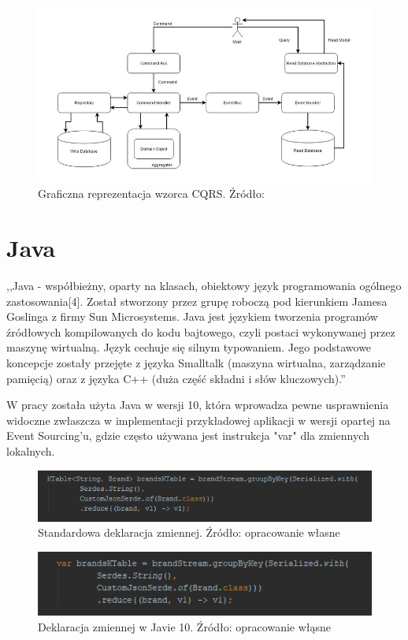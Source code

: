 \begin{figure}[h!]
  \centering
    \includegraphics[width=1.0\textwidth]{images/cqrs.jpg}
  \caption{Graficzna reprezentacja wzorca CQRS. Źródło: \cite{EventSourcing1} }
\end{figure}

\section{Java}
,,Java - współbieżny, oparty na klasach, obiektowy język programowania ogólnego zastosowania[4]. Został stworzony przez grupę roboczą pod kierunkiem Jamesa Goslinga z firmy Sun Microsystems. Java jest językiem tworzenia programów źródłowych kompilowanych do kodu bajtowego, czyli postaci wykonywanej przez maszynę wirtualną. Język cechuje się silnym typowaniem. Jego podstawowe koncepcje zostały przejęte z języka Smalltalk (maszyna wirtualna, zarządzanie pamięcią) oraz z języka C++ (duża część składni i słów kluczowych).''\cite{java}

W pracy została użyta Java w wersji 10, która wprowadza pewne usprawnienia widoczne zwłaszcza w implementacji przykładowej aplikacji w wersji opartej na Event Sourcing'u, gdzie często używana jest instrukcja "var" dla zmiennych lokalnych.


\begin{figure}[!htb]
  \centering
    \includegraphics[width=1.0\textwidth]{images/java102.PNG}
  \caption{Standardowa deklaracja zmiennej. Źródło: opracowanie własne}
\end{figure}
\begin{figure}[!htb]
  \centering
    \includegraphics[width=1.0\textwidth]{images/java10.PNG}
  \caption{Deklaracja zmiennej w Javie 10. Źródło: opracowanie włąsne}
\end{figure}

